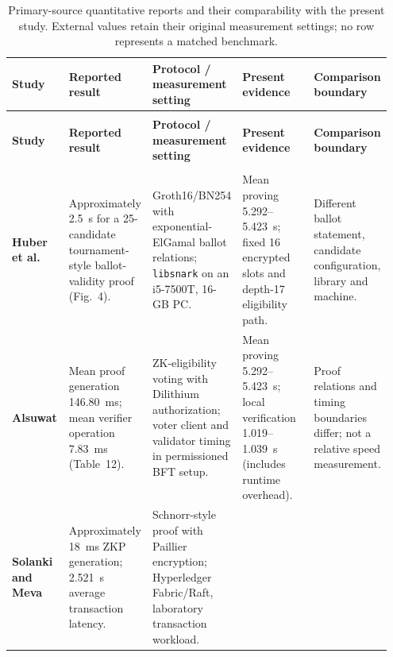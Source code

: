 \begingroup
\footnotesize
\setlength{\tabcolsep}{2.5pt}
\renewcommand{\arraystretch}{1.16}
\begin{longtable}{@{}>{\raggedright\arraybackslash}p{0.15\linewidth}>{\raggedright\arraybackslash}p{0.22\linewidth}>{\raggedright\arraybackslash}p{0.22\linewidth}>{\raggedright\arraybackslash}p{0.19\linewidth}>{\raggedright\arraybackslash}p{0.17\linewidth}@{}}
\caption{Primary-source quantitative reports and their comparability with the present study. External values retain their original measurement settings; no row represents a matched benchmark.}\label{tab:discussion-external-metrics}\\
\toprule
\textbf{Study} & \textbf{Reported result} & \textbf{Protocol / measurement setting} & \textbf{Present evidence} & \textbf{Comparison boundary} \\
\midrule
\endfirsthead
\multicolumn{5}{@{}l}{\textit{Table~\thetable\ (continued)}}\\[2pt]
\toprule
\textbf{Study} & \textbf{Reported result} & \textbf{Protocol / measurement setting} & \textbf{Present evidence} & \textbf{Comparison boundary} \\
\midrule
\endhead
\midrule
\multicolumn{5}{r@{}}{\textit{Continued on the next page}}\\
\endfoot
\bottomrule
\endlastfoot
\textbf{Huber et al.} \citep{huber2025ballotvalidity}
& Approximately 2.5~s for a 25-candidate tournament-style ballot-validity proof (Fig.~4).
& Groth16/BN254 with exponential-ElGamal ballot relations; \texttt{libsnark} on an i5-7500T, 16-GB PC.
& Mean proving 5.292--5.423~s; fixed 16 encrypted slots and depth-17 eligibility path.
& Different ballot statement, candidate configuration, library and machine. \\
\addlinespace[3pt]
\textbf{Alsuwat} \citep{alsuwat2026voting}
& Mean proof generation 146.80~ms; mean verifier operation 7.83~ms (Table~12).
& ZK-eligibility voting with Dilithium authorization; voter client and validator timing in permissioned BFT setup.
& Mean proving 5.292--5.423~s; local verification 1.019--1.039~s (includes runtime overhead).
& Proof relations and timing boundaries differ; not a relative speed measurement. \\
\addlinespace[3pt]
\textbf{Solanki and Meva} \citep{solanki2026hybrid}
& Approximately 18~ms ZKP generation; 2.521~s average transaction latency.
& Schnorr-style proof with Paillier encryption; Hyperledger Fabric/Raft, laboratory transaction workload.

\end{longtable}
